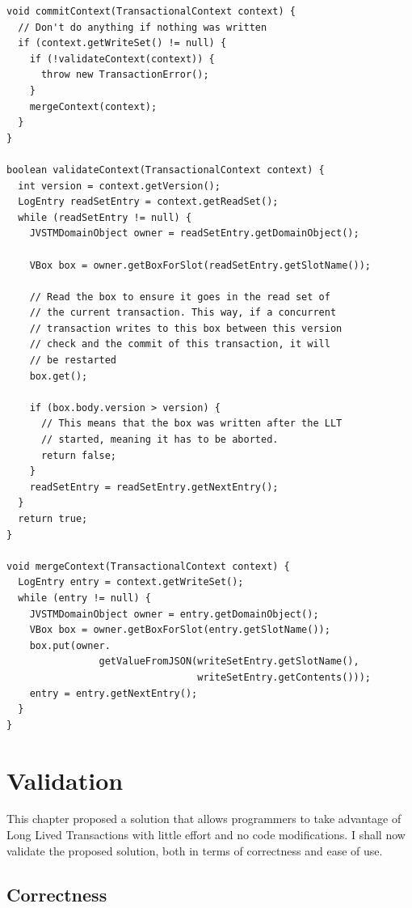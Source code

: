 \begin{lstlisting}[caption={Implementation of the Long Lived
    Transaction commit operation}, label={list:lltCommit}, float]
void commitContext(TransactionalContext context) {
  // Don't do anything if nothing was written
  if (context.getWriteSet() != null) {
    if (!validateContext(context)) {
      throw new TransactionError();
    }
    mergeContext(context);
  }
}

boolean validateContext(TransactionalContext context) {
  int version = context.getVersion();
  LogEntry readSetEntry = context.getReadSet();
  while (readSetEntry != null) {
    JVSTMDomainObject owner = readSetEntry.getDomainObject();

    VBox box = owner.getBoxForSlot(readSetEntry.getSlotName());

    // Read the box to ensure it goes in the read set of 
    // the current transaction. This way, if a concurrent 
    // transaction writes to this box between this version
    // check and the commit of this transaction, it will
    // be restarted
    box.get();

    if (box.body.version > version) {
      // This means that the box was written after the LLT
      // started, meaning it has to be aborted.
      return false;
    }
    readSetEntry = readSetEntry.getNextEntry();
  }
  return true;
}

void mergeContext(TransactionalContext context) {
  LogEntry entry = context.getWriteSet();
  while (entry != null) {
    JVSTMDomainObject owner = entry.getDomainObject();
    VBox box = owner.getBoxForSlot(entry.getSlotName());
    box.put(owner.
                getValueFromJSON(writeSetEntry.getSlotName(), 
                                 writeSetEntry.getContents()));
    entry = entry.getNextEntry();
  }
}
\end{lstlisting}

\section{Validation}
\label{sec:validation}

This chapter proposed a solution that allows programmers to take
advantage of Long Lived Transactions with little effort and no code
modifications. I shall now validate the proposed solution, both in
terms of correctness and ease of use.

\subsection{Correctness}

